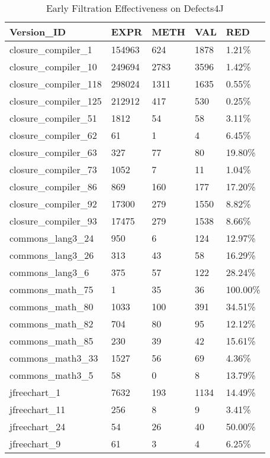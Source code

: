 \begin{table}[!t]
	\centering
	\caption{Early Filtration Effectiveness on Defects4J}
	\label{defects4j}
	\begin{tabular}{|l|l|l|l|l|}
		\hline
		Version\_ID            & EXPR  & METH & VAL & RED   \\ \hline
		closure\_compiler\_1   & 154963 & 624 & 1878     & 1.21\%   \\ \hline
		closure\_compiler\_10  & 249694 & 2783 & 3596     & 1.42\%   \\ \hline
		closure\_compiler\_118 & 298024 & 1311 & 1635     & 0.55\%   \\ \hline
		closure\_compiler\_125 & 212912 & 417 & 530      & 0.25\%   \\ \hline
		closure\_compiler\_51  & 1812   & 54   & 58       & 3.11\%   \\ \hline
		closure\_compiler\_62  & 61     & 1     & 4        & 6.45\%   \\ \hline
		closure\_compiler\_63  & 327    & 77    & 80       & 19.80\%  \\ \hline
		closure\_compiler\_73  & 1052   & 7   & 11       & 1.04\%   \\ \hline
		closure\_compiler\_86  & 869    & 160   & 177      & 17.20\%  \\ \hline
		closure\_compiler\_92  & 17300  & 279  & 1550     & 8.82\%   \\ \hline
		closure\_compiler\_93  & 17475  & 279  & 1538     & 8.66\%   \\ \hline
		commons\_lang3\_24     & 950    & 6    & 124      & 12.97\%  \\ \hline
		commons\_lang3\_26     & 313    & 43    & 58       & 16.29\%  \\ \hline
		commons\_lang3\_6      & 375    & 57    & 122      & 28.24\%  \\ \hline
		commons\_math\_75      & 1      & 35     & 36       & 100.00\% \\ \hline
		commons\_math\_80      & 1033   & 100   & 391      & 34.51\%  \\ \hline
		commons\_math\_82      & 704    & 80    & 95       & 12.12\%  \\ \hline
		commons\_math\_85      & 230    & 39    & 42       & 15.61\%  \\ \hline
		commons\_math3\_33     & 1527   & 56   & 69       & 4.36\%   \\ \hline
		commons\_math3\_5      & 58     & 0     & 8        & 13.79\%  \\ \hline
		jfreechart\_1          & 7632   & 193   & 1134     & 14.49\%  \\ \hline
		jfreechart\_11         & 256    & 8    & 9        & 3.41\%   \\ \hline
		jfreechart\_24         & 54     & 26     & 40       & 50.00\%  \\ \hline
		jfreechart\_9          & 61     & 3     & 4        & 6.25\%   \\ \hline
	\end{tabular}
	\vspace{-0.7em}
\end{table}


